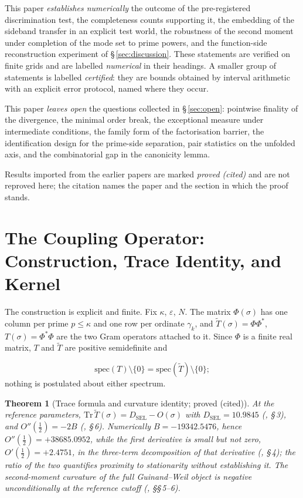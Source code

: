 \documentclass[11pt]{article}
\newtheorem{theorem}{Theorem}[section]
\newcommand{\Tt}{\widetilde{T}}
\newcommand{\DSEL}{D_{\mathrm{SEL}}}
\begin{document}
This paper \emph{establishes numerically} the outcome of the pre-registered
discrimination test, the completeness counts supporting it, the embedding of
the sideband transfer in an explicit test world, the robustness of the second
moment under completion of the mode set to prime powers, and the
function-side reconstruction experiment of \S\,\ref{sec:discussion}. These
statements are verified on finite grids and are labelled \emph{numerical} in
their headings.
A smaller group of statements is labelled \emph{certified}: they are bounds
obtained by interval arithmetic with an explicit error protocol, named where
they occur.

This paper \emph{leaves open} the questions collected in \S\,\ref{sec:open}:
pointwise finality of the divergence, the minimal order break, the
exceptional measure under intermediate conditions, the family form of the
factorisation barrier, the identification design for the prime-side
separation, pair statistics on the unfolded axis, and the combinatorial gap
in the canonicity lemma.

Results imported from the earlier papers are marked \emph{proved (cited)} and
are not reproved here; the citation names the paper and the section in which
the proof stands.

\section{The Coupling Operator: Construction, Trace Identity, and Kernel}
\label{sec:operator}

The construction is explicit and finite. Fix $\kappa$, $\varepsilon$, $N$. The
matrix $\Phi(\sigma)$ has one column per prime $p\le\kappa$ and one row per
ordinate $\gamma_k$, and $\Tt(\sigma)=\Phi\Phi^*$, $T(\sigma)=\Phi^*\Phi$ are
the two Gram operators attached to it. Since $\Phi$ is a finite real matrix,
$T$ and $\Tt$ are positive semidefinite and

\[
\mathrm{spec}(T)\setminus\{0\}=\mathrm{spec}(\Tt)\setminus\{0\};
\]
 nothing is
postulated about either spectrum.

\begin{theorem}[Trace formula and curvature identity; proved (cited)]
\label{thm:imported}
At the reference parameters,
$\mathrm{Tr}\,\Tt(\sigma)=\DSEL-O(\sigma)$ with $\DSEL=10.9845$
(\cite{Paper5}, \S\,3), and $O''(\tfrac12)=-2B$ (\cite{Paper6}, \S\,6).
Numerically $B=-19342.5476$, hence $O''(\tfrac12)=+38685.0952$, while the
first derivative is small but not zero, $O'(\tfrac12)=+2.4751$, in the
three-term decomposition of that derivative (\cite{Paper7}, \S\,4); the ratio
of the two quantifies proximity to stationarity without establishing it. The second-moment curvature of the full
Guinand--Weil object is negative unconditionally at the reference cutoff
(\cite{Paper8}, \S\S\,5--6).
\end{theorem}
\end{document}
